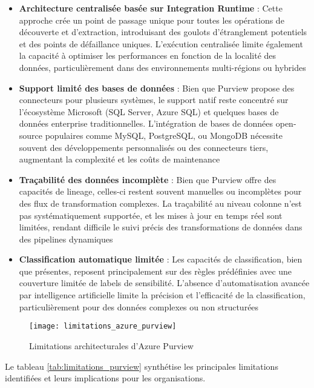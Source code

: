 \begin{itemize}
    \item \textbf{Architecture centralisée basée sur Integration Runtime} : Cette approche crée un point de passage unique pour toutes les opérations de découverte et d'extraction, introduisant des goulots d'étranglement potentiels et des points de défaillance uniques. L'exécution centralisée limite également la capacité à optimiser les performances en fonction de la localité des données, particulièrement dans des environnements multi-régions ou hybrides
    
    \item \textbf{Support limité des bases de données} : Bien que Purview propose des connecteurs pour plusieurs systèmes, le support natif reste concentré sur l'écosystème Microsoft (SQL Server, Azure SQL) et quelques bases de données enterprise traditionnelles. L'intégration de bases de données open-source populaires comme MySQL, PostgreSQL, ou MongoDB nécessite souvent des développements personnalisés ou des connecteurs tiers, augmentant la complexité et les coûts de maintenance
    
    \item \textbf{Traçabilité des données incomplète} : Bien que Purview offre des capacités de lineage, celles-ci restent souvent manuelles ou incomplètes pour des flux de transformation complexes. La traçabilité au niveau colonne n'est pas systématiquement supportée, et les mises à jour en temps réel sont limitées, rendant difficile le suivi précis des transformations de données dans des pipelines dynamiques
    
    \item \textbf{Classification automatique limitée} : Les capacités de classification, bien que présentes, reposent principalement sur des règles prédéfinies avec une couverture limitée de labels de sensibilité. L'absence d'automatisation avancée par intelligence artificielle limite la précision et l'efficacité de la classification, particulièrement pour des données complexes ou non structurées
\end{itemize}

\begin{figure}[htpb]
\centering
\texttt{[image: limitations\_azure\_purview]}
\caption{Limitations architecturales d'Azure Purview}
\label{fig:limitations_purview}
\end{figure}

Le tableau \ref{tab:limitations_purview} synthétise les principales limitations identifiées et leurs implications pour les organisations.

